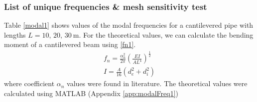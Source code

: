 \subsubsection{List of unique frequencies \& mesh sensitivity test}
Table \ref{modal1} shows values of the modal frequencies for a cantilevered pipe with lengths $L = 10,\,20,\,\SI{30}{\meter}$. For the theoretical values, we can calculate the bending moment of a cantilevered beam using \eqref{fn1}.
\begin{gather}
    f_n = \frac{\alpha_n^2}{2\pi}\left(\frac{EI}{AL^4}\right)^{\frac{1}{2}}\label{fn1}\\
    I = \frac{A}{16}\left(d^2_e + d^2_i\right)
\end{gather}
where coefficient $\alpha_n$ values were found in literature. The theoretical values were calculated using MATLAB (Appendix \ref{app:modalFreq1})
